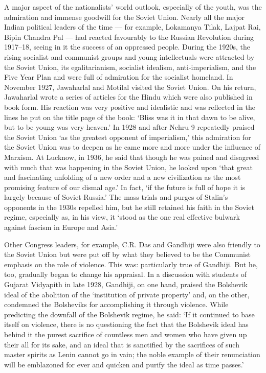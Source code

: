 A major aspect of the nationalists' world outlook, especially of the youth, was the admiration and immense goodwill for the Soviet Union. Nearly all the major Indian political leaders of the time --- for example, Lokamanya Tilak, Lajpat Rai, Bipin Chandra Pal --- had reacted favourably to the Russian Revolution during 1917--18, seeing in it the success of an oppressed people. During the 1920s, the rising socialist and communist groups and young intellectuals were attracted by the Soviet Union, its egalitarianism, socialist idealism, anti-imperialism, and the Five Year Plan and were full of admiration for the socialist homeland. In November 1927, Jawaharlal and Motilal visited the Soviet Union. On his return, Jawaharlal wrote a series of articles for the Hindu which were also published in book form. His reaction was very positive and idealistic and was reflected in the lines he put on the title page of the book: `Bliss was it in that dawn to be alive, but to be young was very heaven.' In 1928 and after Nehru 9 repeatedly praised the Soviet Union `as the greatest opponent of imperialism,' this admiration for the Soviet Union was to deepen as he came more and more under the influence of Marxism. At Lucknow, in 1936, he said that though he was pained and disagreed with much that was happening in the Soviet Union, he looked upon `that great and fascinating unfolding of a new order and a new civilization as the most promising feature of our dismal age.' In fact, `if the future is full of hope it is largely because of Soviet Russia.' The mass trials and purges of Stalin's opponents in the 1930s repelled him, but he still retained his faith in the Soviet regime, especially as, in his view, it `stood as the one real effective bulwark against fascism in Europe and Asia.' 

Other Congress leaders, for example, C.R. Das and Gandhiji were also friendly to the Soviet Union but were put off by what they believed to be the Communist emphasis on the role of violence. This was: particularly true of Gandhiji. But he, too, gradually began to change his appraisal. In a discussion with students of Gujarat Vidyapith in late 1928, Gandhiji, on one hand, praised the Bolshevik ideal of the abolition of the `institution of private property' and, on the other, condemned the Bolsheviks for accomplishing it through violence. While predicting the downfall of the Bolshevik regime, he said: `If it continued to base itself on violence, there is no questioning the fact that the Bolshevik ideal has behind it the purest sacrifice of countless men and women who have given up their all for its sake, and an ideal that is sanctified by the sacrifices of such master spirits as Lenin cannot go in vain; the noble example of their renunciation will be emblazoned for ever and quicken and purify the ideal as time passes.' 

